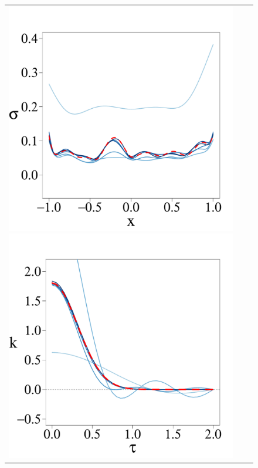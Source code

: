 \documentclass[onecolumn,a4paper,11pt]{article}
\begin{document}
\begin{figure}
\begin{tabular}{ c c c }
\includegraphics[scale=0.215, trim = 0mm 14mm 0mm 14mm, clip]{ch5_fig3_Sigma_part5.pdf} 
\includegraphics[scale=0.215, trim = 0mm 14mm 5mm 14mm, clip]{ch5_fig3_Cov_part5.pdf} & \\

\end{tabular}
\end{figure}
\end{document}
